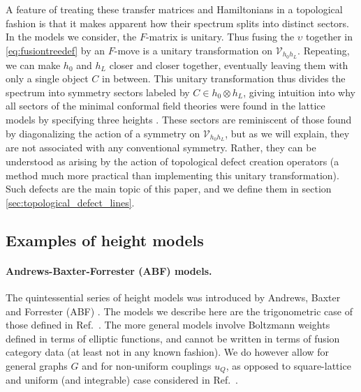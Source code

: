 A feature of treating these transfer matrices and Hamiltonians in a topological fashion is that it makes apparent how their spectrum splits into distinct sectors. In the models we consider, the $F$-matrix is unitary. Thus fusing the $\upsilon$ together in  \eqref{eq:fusiontreedef} by an $F$-move is a unitary transformation on $\mathcal{V}_{h_0 h_L}$. Repeating, we can make $h_0$ and $h_L$ closer and closer together, eventually leaving them with only a single object $C$ in between. This unitary transformation thus divides the spectrum into symmetry sectors labeled by $C\in h_0\otimes h_L$, giving intuition into why all sectors of the minimal conformal field theories were found in the lattice models by specifying three heights \cite{Saleur1989}. These sectors are reminiscent of those found by diagonalizing the action of a symmetry on $\mathcal{V}_{h_0 h_L}$, but as we will explain, they are not associated with any conventional symmetry. Rather, they can be understood as arising by the action of topological defect creation operators (a method much more practical than implementing this unitary transformation). Such defects are the main topic of this paper, and we define them in section \ref{sec:topological_defect_lines}.


\subsection{Examples of height models} 
\label{sec:heightexamples}




\paragraph{Andrews-Baxter-Forrester (ABF) models.}

The quintessential series of height models was introduced by Andrews, Baxter and Forrester (ABF) \cite{Andrews1984}.    The models we describe here are the trigonometric case of those defined in Ref.~\cite{Andrews1984}. The more general models involve Boltzmann weights defined in terms of elliptic functions, and cannot be written in terms of fusion category data (at least not in any known fashion).
We do however allow for general graphs $G$ and for non-uniform couplings $u_Q$, as opposed to square-lattice and uniform (and integrable) case considered in Ref.~\cite{Andrews1984}.

